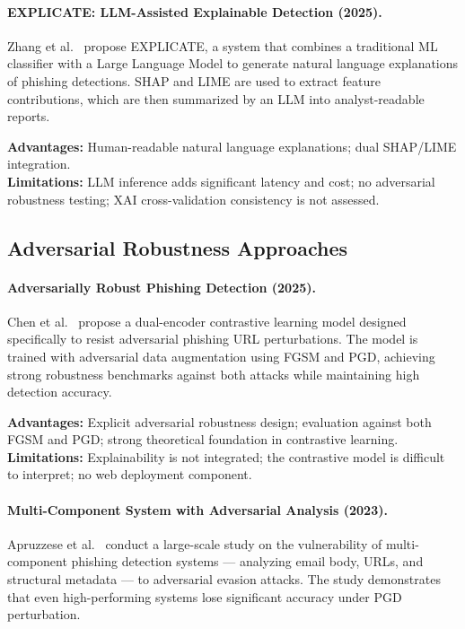 \paragraph{EXPLICATE: LLM-Assisted Explainable Detection (2025).}
Zhang et al.~\cite{ref_arxiv} propose EXPLICATE, a system that combines a traditional ML classifier with a Large Language Model to generate natural language explanations of phishing detections. SHAP and LIME are used to extract feature contributions, which are then summarized by an LLM into analyst-readable reports.

\textbf{Advantages:} Human-readable natural language explanations; dual SHAP/LIME integration.\\
\textbf{Limitations:} LLM inference adds significant latency and cost; no adversarial robustness testing; XAI cross-validation consistency is not assessed.

\subsection{Adversarial Robustness Approaches}

\paragraph{Adversarially Robust Phishing Detection (2025).}
Chen et al.~\cite{ref_discovery} propose a dual-encoder contrastive learning model designed specifically to resist adversarial phishing URL perturbations. The model is trained with adversarial data augmentation using FGSM and PGD, achieving strong robustness benchmarks against both attacks while maintaining high detection accuracy.

\textbf{Advantages:} Explicit adversarial robustness design; evaluation against both FGSM and PGD; strong theoretical foundation in contrastive learning.\\
\textbf{Limitations:} Explainability is not integrated; the contrastive model is difficult to interpret; no web deployment component.

\paragraph{Multi-Component System with Adversarial Analysis (2023).}
Apruzzese et al.~\cite{multi_component} conduct a large-scale study on the vulnerability of multi-component phishing detection systems — analyzing email body, URLs, and structural metadata — to adversarial evasion attacks. The study demonstrates that even high-performing systems lose significant accuracy under PGD perturbation.

